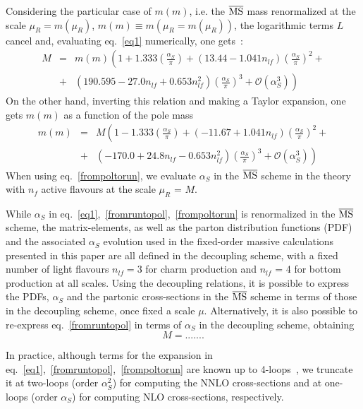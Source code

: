 \documentclass[12pt,a4paper]{article}
\begin{document}
Considering the particular case of $m(m)$, i.e. the $\overline{\rm MS}$ mass renormalized at the scale $\mu_R = m(\mu_R)$, $m(m) \equiv m(\mu_R=m(\mu_R))$, the logarithmic terms $L$ cancel and, evaluating eq.~\ref{eq1} numerically, one gets~\cite{Chetyrkin:1999ys}:
\begin{eqnarray} 
M & = & m(m) \left(1 + 1.333 \left(\frac{\alpha_S}{\pi}\right) + \left(13.44 - 1.041 n_{lf}\right) \left(\frac{\alpha_S}{\pi}\right)^2  + \right. \nonumber \\ 
&+ & \left.   \left(190.595 - 27.0 n_{lf} + 0.653 n_{lf}^2\right) \left(\frac{\alpha_S}{\pi}\right)^3 + \mathcal{O}(\alpha_S^3)\right)
\label{fromruntopol}
\end{eqnarray}
On the other hand, inverting this relation and making a Taylor expansion, one gets $m(m)$ as a function of the pole mass  
\begin{eqnarray}
m(m) & = & M \left(1 - 1.333 \left(\frac{\alpha_S}{\pi}\right) + (-11.67 + 1.041 n_{lf}) \left(\frac{\alpha_S}{\pi}\right)^2 + \right. \nonumber \\ 
& + & \left . \left(-170.0 + 24.8 n_{lf} - 0.653 n_{lf}^2\right) \left(\frac{\alpha_S}{\pi}\right)^3 + \mathcal{O}(\alpha_S^3)\right)
\label{frompoltorun}
\end{eqnarray}
When using eq.~\ref{frompoltorun}, we evaluate $\alpha_S$ in the $\overline{\rm MS}$ scheme in the theory with $n_f$ active flavours at the scale $\mu_R$ = $M$. 

While $\alpha_S$ in eq.~\ref{eq1},~\ref{fromruntopol},~\ref{frompoltorun} is renormalized in the $\overline{\rm MS}$ scheme, the matrix-elements, as well as the parton distribution functions (PDF) and the associated $\alpha_S$ evolution used in the fixed-order massive calculations presented in this paper are all defined in the decoupling scheme, with a fixed number of light flavours $n_{lf} = 3$ for charm production and $n_{lf}$ = 4 for bottom production at all scales. Using the decoupling relations, it is possible to express the PDFs, $\alpha_S$ and the partonic cross-sections in the $\overline{\rm MS}$ scheme in terms of those in the decoupling scheme, once fixed a scale $\mu$. 
Alternatively, it is also possible to re-express eq.~\ref{fromruntopol} in terms of $\alpha_S$ in the decoupling scheme, obtaining
\begin{equation}
M = .......
\end{equation} 

In practice, although terms for the expansion in eq.~\ref{eq1},~\ref{fromruntopol},~\ref{frompoltorun} are known up to 4-loops~\cite{Marquard:2015qpa}, we truncate it at two-loops (order $\alpha_S^2$) for computing the NNLO cross-sections and at one-loops (order $\alpha_S$) for computing NLO cross-sections, respectively. 
\end{document}
